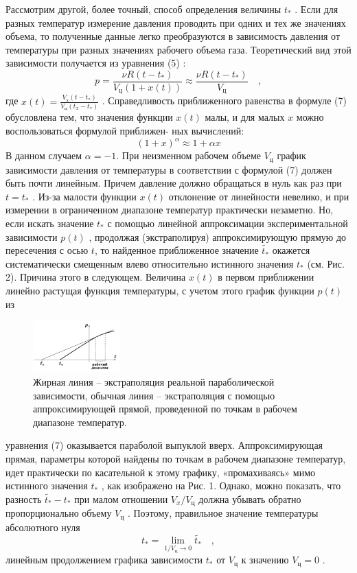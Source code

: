 \documentclass[11pt,a4paper]{article}
\begin{document}
Рассмотрим другой, более точный, способ определения величины $t_*$ . Если для разных
температур измерение давления проводить при одних и тех же значениях объема, то
полученные данные легко преобразуются в зависимость давления от температуры при разных
значениях рабочего объема газа. Теоретический вид этой зависимости получается из уравнения
(5) :
\begin{equation}
	p =\frac{\nu R(t-t_*)}{V_ц(1+x(t))} \approx \frac{\nu R(t-t_*)}{V_ц} \quad ,
\end{equation}
где $x(t) = \frac{V_х(t-t_*)}{V_ц(t_x - t_*)}$ . Справедливость приближенного равенства в формуле (7) обусловлена тем, что значения функции $x(t)$ малы, и для малых $x$ можно воспользоваться формулой приближен-
ных вычислений:
\begin{equation}
	(1+x)^\alpha \approx 1 + \alpha x
\end{equation}
В данном случаем $\alpha = -1$.
При неизменном рабочем объеме $V_ц$ график зависимости давления от температуры в
соответствии с формулой (7) должен быть почти линейным. Причем давление должно
обращаться в нуль как раз при $t = t_*$ . Из-за малости функции $x(t)$ отклонение от линейности
невелико, и при измерении в ограниченном диапазоне температур практически незаметно. Но,
если искать значение $t_*$ с помощью линейной аппроксимации экспериментальной зависимости
$p(t)$ , продолжая (экстраполируя) аппроксимирующую прямую до пересечения с осью $t$, то
найденное приближенное значение $\widetilde{t_*}$ окажется систематически смещенным влево относительно
истинного значения $t_*$ (см. Рис. 2). Причина этого в следующем. Величина $x(t)$ в первом
приближении линейно растущая функция температуры, с учетом этого график функции $p(t)$ из
\begin{figure}
	\includegraphics[width=0.3\textwidth]{../im2.png}
	\caption{Жирная линия -- экстраполяция реальной параболической зависимости, обычная линия -- экстраполяция с
		помощью аппроксимирующей
		прямой, проведенной по точкам в
		рабочем диапазоне температур.}
\end{figure}
уравнения (7) оказывается параболой выпуклой вверх.
Аппроксимирующая прямая, параметры которой найдены
по точкам в рабочем диапазоне температур, идет
практически по касательной к этому графику,
«промахиваясь» мимо истинного значения $t_*$ , как
изображено на Рис. 1. Однако, можно показать, что
разность $\widetilde{t_*} - t_*$ при малом отношении $V_x/V_ц$ должна
убывать обратно пропорционально объему $V_ц$ . Поэтому,
правильное значение температуры абсолютного нуля
\begin{equation}
	t_* = \lim\limits_{1/V_ц \to 0} \widetilde{t_*} \quad ,
\end{equation}
линейным продолжением графика зависимости $t_*$ от $V_ц$
к значению $V_ц =0$ .
~\\\\\\\\
\newpage
\end{document}
